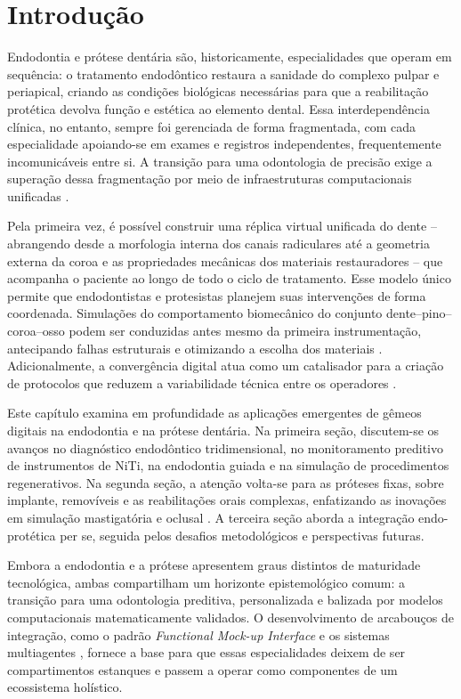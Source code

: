 \section{Introdução}

Endodontia e prótese dentária são, historicamente, especialidades que operam em sequência: o tratamento endodôntico restaura a sanidade do complexo pulpar e periapical, criando as condições biológicas necessárias para que a reabilitação protética devolva função e estética ao elemento dental. Essa interdependência clínica, no entanto, sempre foi gerenciada de forma fragmentada, com cada especialidade apoiando-se em exames e registros independentes, frequentemente incomunicáveis entre si. A transição para uma odontologia de precisão exige a superação dessa fragmentação por meio de infraestruturas computacionais unificadas \cite{techsoc2025precision}.


Pela primeira vez, é possível construir uma réplica virtual unificada do dente -- abrangendo desde a morfologia interna dos canais radiculares até a geometria externa da coroa e as propriedades mecânicas dos materiais restauradores -- que acompanha o paciente ao longo de todo o ciclo de tratamento. Esse modelo único permite que endodontistas e protesistas planejem suas intervenções de forma coordenada. Simulações do comportamento biomecânico do conjunto dente--pino--coroa--osso podem ser conduzidas antes mesmo da primeira instrumentação, antecipando falhas estruturais e otimizando a escolha dos materiais \cite{khoshfekr2025digital}. Adicionalmente, a convergência digital atua como um catalisador para a criação de protocolos que reduzem a variabilidade técnica entre os operadores \cite{mdpi2025convergence}.

Este capítulo examina em profundidade as aplicações emergentes de gêmeos digitais na endodontia e na prótese dentária. Na primeira seção, discutem-se os avanços no diagnóstico endodôntico tridimensional, no monitoramento preditivo de instrumentos de NiTi, na endodontia guiada e na simulação de procedimentos regenerativos. Na segunda seção, a atenção volta-se para as próteses fixas, sobre implante, removíveis e as reabilitações orais complexas, enfatizando as inovações em simulação mastigatória e oclusal \cite{roy2025applications}. A terceira seção aborda a integração endo-protética per se, seguida pelos desafios metodológicos e perspectivas futuras.

Embora a endodontia e a prótese apresentem graus distintos de maturidade tecnológica, ambas compartilham um horizonte epistemológico comum: a transição para uma odontologia preditiva, personalizada e balizada por modelos computacionais matematicamente validados. O desenvolvimento de arcabouços de integração, como o padrão \textit{Functional Mock-up Interface} e os sistemas multiagentes \cite{infante2024fmi, infante2025distributed}, fornece a base para que essas especialidades deixem de ser compartimentos estanques e passem a operar como componentes de um ecossistema holístico.
